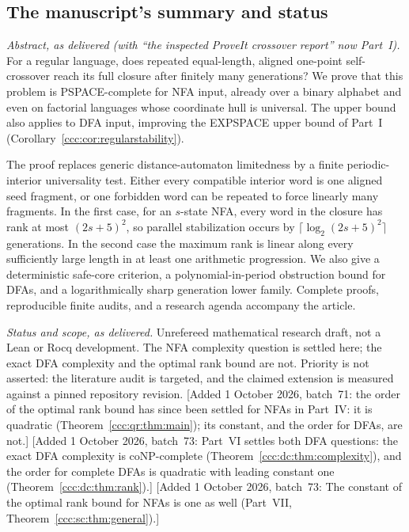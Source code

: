 \documentclass[11pt,letterpaper]{article}
\theoremstyle{definition}
\theoremstyle{remark}
\newcommand{\waddsevone}[1]{\textup{[}Added 1 October 2026, batch~71: #1\textup{]}}
\newcommand{\waddsevthree}[1]{\textup{[}Added 1 October 2026, batch~73: #1\textup{]}}
\begin{document}
\subsection{The manuscript's summary and status}\label{ccc:ps:sec:abstract}

\emph{Abstract, as delivered (with ``the inspected ProveIt crossover report''
now Part~I).} For a regular language, does repeated equal-length, aligned
one-point self-crossover reach its full closure after finitely many
generations? We prove that this problem is PSPACE-complete for NFA input,
already over a binary alphabet and even on factorial languages whose
coordinate hull is universal. The upper bound also applies to DFA input,
improving the EXPSPACE upper bound of Part~I
(Corollary~\ref{ccc:cor:regularstability}).

The proof replaces generic distance-automaton limitedness by a finite
periodic-interior universality test. Either every compatible interior word
is one aligned seed fragment, or one forbidden word can be repeated to force
linearly many fragments. In the first case, for an $s$-state NFA, every word
in the closure has rank at most $(2s+5)^2$, so parallel stabilization occurs
by $\lceil\log_2(2s+5)^2\rceil$ generations. In the second case the maximum
rank is linear along every sufficiently large length in at least one
arithmetic progression. We also give a deterministic safe-core criterion, a
polynomial-in-period obstruction bound for DFAs, and a logarithmically sharp
generation lower family. Complete proofs, reproducible finite audits, and a
research agenda accompany the article.

\emph{Status and scope, as delivered.} Unrefereed mathematical research
draft, not a Lean or Rocq development. The NFA complexity question is settled
here; the exact DFA complexity and the optimal rank bound are not. Priority is
not asserted: the literature audit is targeted, and the claimed extension is
measured against a pinned repository revision.
\waddsevone{the order of the optimal rank bound has since been settled for
NFAs in Part~IV: it is quadratic (Theorem~\ref{ccc:qr:thm:main}); its
constant, and the order for DFAs, are not.}
\waddsevthree{Part~VI settles both DFA questions: the exact DFA complexity is
coNP-complete (Theorem~\ref{ccc:dc:thm:complexity}), and the order for
complete DFAs is quadratic with leading constant one
(Theorem~\ref{ccc:dc:thm:rank}).}
\waddsevthree{The constant of the optimal rank bound for NFAs is one as well
(Part~VII, Theorem~\ref{ccc:sc:thm:general}).}
\end{document}
